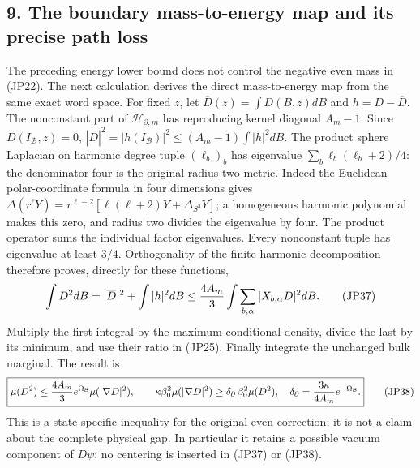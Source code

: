 \documentclass[11pt]{article}
\begin{document}
\subsection*{9. The boundary mass-to-energy map and its precise path loss}

The preceding energy lower bound does not control the negative even
mass in (JP22). The next calculation derives the direct mass-to-energy
map from the same exact word space. For fixed \(z\), let
\(\overline D(z)=\int D(B,z)dB\) and \(h=D-\overline D\).
The nonconstant part of \(\mathcal H_{\partial,m}\) has reproducing
kernel diagonal \(A_m-1\). Since \(D(I_{\mathcal B},z)=0\),
\(|\overline D|^2=|h(I_{\mathcal B})|^2\le(A_m-1)\int|h|^2dB\).
The product sphere Laplacian on harmonic degree tuple
\((\ell_b)_b\) has eigenvalue
\(\sum_b\ell_b(\ell_b+2)/4\): the denominator four is the original
radius-two metric. Indeed the Euclidean polar-coordinate formula in
four dimensions gives
\(\Delta(r^\ell Y)=r^{\ell-2}
[\ell(\ell+2)Y+\Delta_{S^3}Y]\); a homogeneous harmonic polynomial
makes this zero, and radius two divides the eigenvalue by four.
The product operator sums the individual factor eigenvalues.
Every nonconstant tuple has eigenvalue at least
\(3/4\). Orthogonality of the finite harmonic decomposition therefore
proves, directly for these functions,
\[
 \int D^2dB
 =|\overline D|^2+\int|h|^2dB
 \le {4A_m\over3}
             \int\sum_{b,\alpha}|X_{b,\alpha}D|^2dB .
 \tag{JP37}
\]
Multiply the first integral by the maximum conditional density,
divide the last by its minimum, and use their ratio in (JP25).
Finally integrate the unchanged bulk marginal. The result is
\[
 \boxed{\displaystyle
 \mu(D^2)\le {4A_m\over3}e^{\Omega_{\mathcal B}}
                      \mu(|\nabla D|^2),\qquad
 \kappa\beta_0^2\mu(|\nabla D|^2)
     \ge\delta_{\partial}\,\beta_0^2\mu(D^2),\quad
 \delta_{\partial}={3\kappa\over4A_m}e^{-\Omega_{\mathcal B}}.}
 \tag{JP38}
\]
This is a state-specific inequality for the original even correction;
it is not a claim about the complete physical gap. In particular it
retains a possible vacuum component of \(D\psi\); no centering is
inserted in (JP37) or (JP38).
\end{document}
